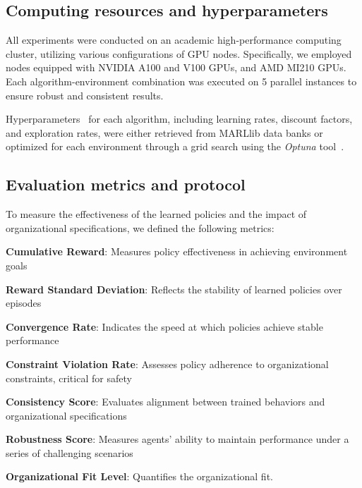 \documentclass[conference]{IEEEtran}
\begin{document}
\subsection{Computing resources and hyperparameters}

All experiments were conducted on an academic high-performance computing cluster, utilizing various configurations of GPU nodes. Specifically, we employed nodes equipped with NVIDIA A100 and V100 GPUs, and AMD MI210 GPUs. Each algorithm-environment combination was executed on 5 parallel instances to ensure robust and consistent results. 

Hyperparameters~\hyperref[fn:github]{\footnotemark[1]} for each algorithm, including learning rates, discount factors, and exploration rates, were either retrieved from MARLlib data banks or optimized for each environment through a grid search using the \textit{Optuna} tool~\cite{akiba2019optuna}.

\subsection{Evaluation metrics and protocol}

To measure the effectiveness of the learned policies and the impact of organizational specifications, we defined the following metrics:
%
\begin{enumerate*}[label={\roman*)}, itemjoin={; \quad}]
    \item \textbf{Cumulative Reward}: Measures policy effectiveness in achieving environment goals
    \item \textbf{Reward Standard Deviation}: Reflects the stability of learned policies over episodes
    \item \textbf{Convergence Rate}: Indicates the speed at which policies achieve stable performance
    \item \textbf{Constraint Violation Rate}: Assesses policy adherence to organizational constraints, critical for safety
    \item \textbf{Consistency Score}: Evaluates alignment between trained behaviors and organizational specifications
    \item \textbf{Robustness Score}: Measures agents' ability to maintain performance under a series of challenging scenarios
    \item \textbf{Organizational Fit Level}: Quantifies the organizational fit.
\end{enumerate*}

\
\end{document}
